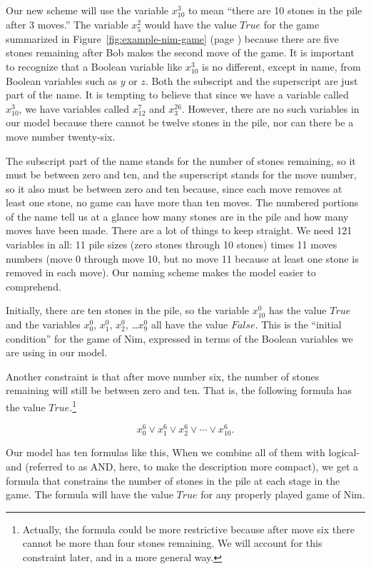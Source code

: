 {{%

Our new scheme will use the variable $x_{10}^{3}$ to mean
``there are 10 stones in the pile after 3 moves.''
The variable $x_{5}^{2}$ would have the value $True$
for the game summarized in
Figure~\ref{fig:example-nim-game} (page \pageref{fig:example-nim-game})
because there are five stones remaining after Bob makes the
second move of the game.
It is important to recognize that a Boolean variable like $x_{10}^{3}$
is no different, except in name, from Boolean variables such as $y$ or $z$.
Both the subscript and the superscript are just part of the name.
It is tempting to believe that since we have a variable called $x_{10}^{3}$,
we have variables called $x_{12}^{7}$ and $x_{3}^{26}$.
However, there are no such variables in our model because there cannot be twelve stones
in the pile, nor can there be a move number twenty-six.

The subscript part of the name stands for the number of stones remaining,
so it must be between zero and ten, and the superscript stands for the
move number, so it also must be between zero and ten because,
since each move removes at least one stone, no game can have more than ten moves.
The numbered portions of the name tell us at
a glance how many stones are in the pile
and how many moves have been made.
There are a lot of things to keep straight.
We need 121 variables in all: 11 pile sizes (zero stones through 10 stones)
times 11 moves numbers (move 0 through move 10,
but no move 11 because at least one stone is removed in each move).
Our naming scheme makes the model easier to comprehend.

Initially, there are ten stones in the pile,
so the variable  $x_{10}^{0}$ has the value $True$
and the variables $x_{0}^{0}$, $x_{1}^{0}$, $x_{2}^{0}$, \dots $x_{9}^{0}$
all have the value $False$.
This is the ``initial condition'' for the game of Nim,
expressed in terms of the Boolean variables we are using
in our model.

Another constraint is that after move number six,
the number of stones remaining will still be between zero and ten.
That is, the following formula has the value $True$.\footnote{Actually,
the formula could be more restrictive because
after move six there cannot be more than four stones remaining.
We will account for this constraint later, and in a more general way.}

$$x_{0}^{6} \vee x_{1}^{6} \vee x_{2}^{6} \vee \cdots \vee x_{10}^{6}.$$

Our model has ten formulas like this,
When we combine all of them with logical-and
(referred to as AND, here, to make the description more compact),
we get a formula that constrains the number of stones
in the pile at each stage in the game.
The formula will have the value $True$ for any properly played game of Nim.

}}
